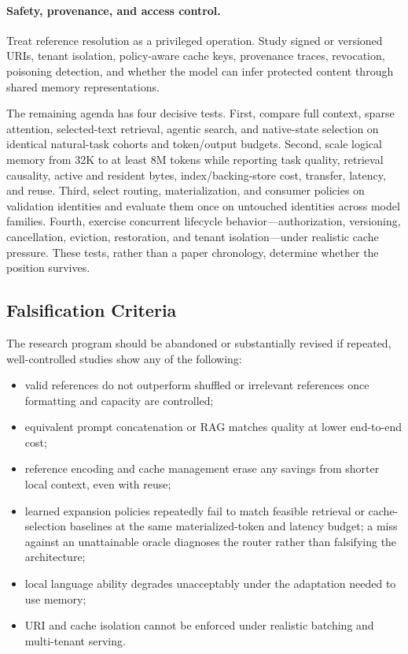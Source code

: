 \documentclass[11pt]{article}
\begin{document}
\paragraph{Safety, provenance, and access control.}
Treat reference resolution as a privileged operation. Study signed or versioned URIs, tenant isolation, policy-aware cache keys, provenance traces, revocation, poisoning detection, and whether the model can infer protected content through shared memory representations.
\fi

The remaining agenda has four decisive tests. First, compare full context, sparse attention,
selected-text retrieval, agentic search, and native-state selection on identical natural-task
cohorts and token/output budgets. Second, scale logical memory from 32K to at least 8M tokens while
reporting task quality, retrieval causality, active and resident bytes, index/backing-store cost,
transfer, latency, and reuse. Third, select routing, materialization, and consumer policies on
validation identities and evaluate them once on untouched identities across model families.
Fourth, exercise concurrent lifecycle behavior---authorization, versioning, cancellation,
eviction, restoration, and tenant isolation---under realistic cache pressure. These tests, rather
than a paper chronology, determine whether the position survives.

\subsection{Falsification Criteria}

The research program should be abandoned or substantially revised if repeated, well-controlled studies show any of the following:

\begin{itemize}[leftmargin=*]
\item valid references do not outperform shuffled or irrelevant references once formatting and capacity are controlled;
\item equivalent prompt concatenation or RAG matches quality at lower end-to-end cost;
\item reference encoding and cache management erase any savings from shorter local context, even with reuse;
\item learned expansion policies repeatedly fail to match feasible retrieval or cache-selection
baselines at the same materialized-token and latency budget; a miss against an unattainable
oracle diagnoses the router rather than falsifying the architecture;
\item local language ability degrades unacceptably under the adaptation needed to use memory;
\item URI and cache isolation cannot be enforced under realistic batching and multi-tenant serving.
\end{itemize}
\end{document}
